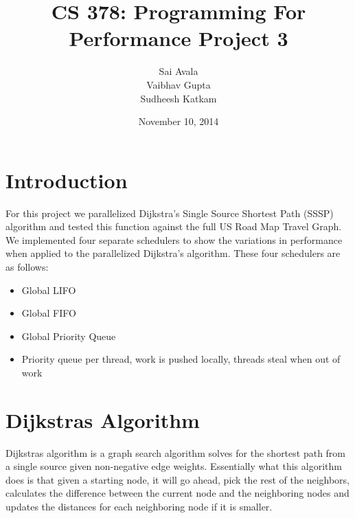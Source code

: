 \documentclass[10pt]{article}
\begin{document}
\title{CS 378: Programming For Performance Project 3}
\author{Sai Avala \\ Vaibhav Gupta \\ Sudheesh Katkam}
\date{November 10, 2014}
\maketitle
\section{Introduction}
\label{introduction}
\sf For this project we parallelized Dijkstra's Single Source Shortest Path (SSSP) algorithm and tested this
function against the full US Road Map Travel Graph. We implemented four separate schedulers to show the variations
in performance when applied to the parallelized Dijkstra's algorithm. These four schedulers are as follows:
\begin{itemize}
    \item Global LIFO
    \item Global FIFO
    \item Global Priority Queue
    \item Priority queue per thread, work is pushed locally, threads steal when out of work
\end{itemize}

\section{Dijkstras Algorithm}
\label{dijkstrasAlgoritm}
\sf Dijkstras algorithm is a graph search algorithm solves for the shortest path from a single source
given non-negative edge weights. Essentially what this algorithm does is that given a starting node,
it will go ahead, pick the rest of the neighbors, calculates the difference between the current
node and the neighboring nodes and updates the distances for each neighboring node if it
is smaller. 
\end{document}
